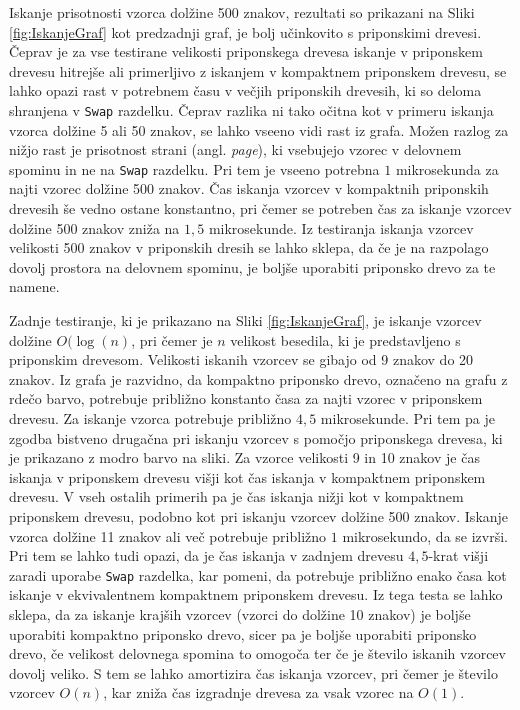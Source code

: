Iskanje prisotnosti vzorca dolžine 500 znakov, rezultati so prikazani na Sliki \ref{fig:IskanjeGraf} kot predzadnji graf, je bolj učinkovito s priponskimi drevesi. Čeprav je za vse testirane velikosti priponskega drevesa iskanje v priponskem drevesu hitrejše ali primerljivo z iskanjem v kompaktnem priponskem drevesu, se lahko opazi rast v potrebnem času v večjih priponskih drevesih, ki so deloma shranjena v \verb|Swap| razdelku. Čeprav razlika ni tako očitna kot v primeru iskanja vzorca dolžine 5 ali 50 znakov, se lahko vseeno vidi rast iz grafa. Možen razlog za nižjo rast je prisotnost strani (angl. \textit{page}), ki vsebujejo vzorec v delovnem spominu in ne na \verb|Swap| razdelku. Pri tem je vseeno potrebna $1$ mikrosekunda za najti vzorec dolžine 500 znakov. Čas iskanja vzorcev v kompaktnih priponskih drevesih še vedno ostane konstantno, pri čemer se potreben čas za iskanje vzorcev dolžine 500 znakov zniža na $1,5$ mikrosekunde. Iz testiranja iskanja vzorcev velikosti 500 znakov v priponskih dresih se lahko sklepa, da če je na razpolago dovolj prostora na delovnem spominu, je boljše uporabiti priponsko drevo za te namene.

Zadnje testiranje, ki je prikazano na Sliki \ref{fig:IskanjeGraf}, je iskanje vzorcev dolžine $O(\log(n)$, pri čemer je $n$ velikost besedila, ki je predstavljeno s priponskim drevesom. Velikosti iskanih vzorcev se gibajo od 9 znakov do 20 znakov. Iz grafa je razvidno, da kompaktno priponsko drevo, označeno na grafu z rdečo barvo, potrebuje približno konstanto časa za najti vzorec v priponskem drevesu. Za iskanje vzorca potrebuje približno $4,5$ mikrosekunde. Pri tem pa je zgodba bistveno drugačna pri iskanju vzorcev s pomočjo priponskega drevesa, ki je prikazano z modro barvo na sliki. Za vzorce velikosti 9 in 10 znakov je čas iskanja v priponskem drevesu višji kot čas iskanja v kompaktnem priponskem drevesu. V vseh ostalih primerih pa je čas iskanja nižji kot v kompaktnem priponskem drevesu, podobno kot pri iskanju vzorcev dolžine 500 znakov. Iskanje vzorca dolžine 11 znakov ali več potrebuje približno $1$ mikrosekundo, da se izvrši. Pri tem se lahko tudi opazi, da je čas iskanja v zadnjem drevesu $4,5$-krat višji zaradi uporabe \verb|Swap| razdelka, kar pomeni, da potrebuje približno enako časa kot iskanje v ekvivalentnem kompaktnem priponskem drevesu. Iz tega testa se lahko sklepa, da za iskanje krajših vzorcev (vzorci do dolžine 10 znakov) je boljše uporabiti kompaktno priponsko drevo, sicer pa je boljše uporabiti priponsko drevo, če velikost delovnega spomina to omogoča ter če je število iskanih vzorcev dovolj veliko. S tem se lahko amortizira čas iskanja vzorcev, pri čemer je število vzorcev $O(n)$, kar zniža čas izgradnje drevesa za vsak vzorec na $O(1)$.

